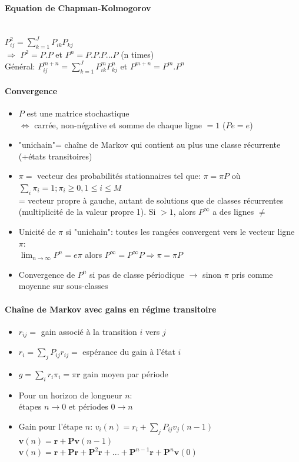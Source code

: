 \documentclass[paper=a4,fontsize=8pt,pagesize,DIV=calc]{scrartcl}
\newcounter{row}
\begin{document}
\begin{multicols}{3}
\paragraph{Equation de Chapman-Kolmogorov}~~\\
$P^2_{ij}=\sum_{k=1}^J P_{ik}P_{kj}$\\$\Rightarrow$ $P^2=P.P$ et $ P^n=P.P.P...P $ (n times)
\\ Général: $P^{m+n}_{ij} =\sum^J_{k=1}P^m_{ik} P^n_{kj}$ et $P^{m+n} = P^m.P^ n$
\paragraph{Convergence}
\begin{itemize}
\item $P$ est une matrice stochastique \\$\Leftrightarrow$ carrée, non-négative et somme de chaque ligne $=1$ ($Pe=e$)
\item "unichain"= chaîne de Markov qui contient au plus une classe récurrente (+états transitoires)
\item $\pi=$ vecteur des probabilités stationnaires tel que:
$\pi=\pi P$ où $\sum_i \pi_i=1;\pi_i\geq 0,1\leq i \leq M$
\\  = vecteur propre à gauche, autant de solutions que de classes récurrentes (multiplicité de la valeur propre 1). Si $>1$, alors $P^{\infty}$ a des lignes $\neq $
\item Unicité de $\pi$ si "unichain": toutes les rangées convergent vers le vecteur ligne $\pi$:\\ $\lim_{n\to \infty}P^n=e\pi$
 alors $P^{\infty}=P^{\infty}P \Rightarrow \pi = \pi P$
\item Convergence de $P^n$ si pas de classe périodique  $\rightarrow $ sinon $\pi$  pris comme moyenne sur sous-classes
\end{itemize}
\paragraph{Chaîne de Markov avec gains en régime transitoire}
\begin{itemize}
\item $r_{ij}=$ gain associé à la transition $i$ vers $j$
\item $r_i=\sum_j P_{ij}r_{ij} =$ espérance du gain à l'état $i$
\item $g=\sum_i r_i\pi_i =\pi \bm{r}$ gain moyen par période
\item Pour un horizon de longueur $n$:\\ étapes $n\rightarrow 0$ et périodes $0\rightarrow n$
\item Gain pour l'étape $n$: $v_i(n)=r_i+\sum_j P_{ij}v_j (n-1)$
\\$\bm{v}(n)=\bm{r}+\bm{P}\bm{v}(n-1)$
\\ $\bm{v}(n)=\bm{r}+\bm{Pr}+\bm{P}^2\bm{r}+...+\bm{P}^{n-1}\bm{r}+\bm{P}^n\bm{v}(0)$
\end{itemize}

\end{multicols}
\end{document}
